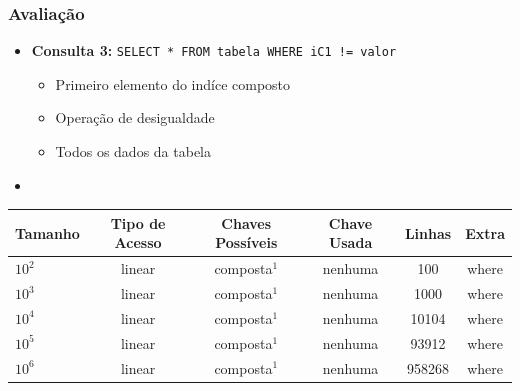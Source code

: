 \documentclass[10pt]{beamer}
\begin{document}
\begin{frame}[fragile]
  \frametitle{Avaliação}

    \begin{itemize}
      \item \textbf{Consulta 3: } \texttt{SELECT * FROM tabela WHERE iC1 != valor}
      \begin{itemize}
        \item[-] Primeiro elemento do indíce composto
        \item[-] Operação de desigualdade
        \item[-] Todos os dados da tabela
      \end{itemize}

      \item[\ ] \ 

    \end{itemize}

     \begin{table}[!htb]
    \footnotesize
    \centering
    \begin{tabular}{lccccc}
      \toprule
      \textbf{Tamanho} & \textbf{Tipo de Acesso}  & \textbf{Chaves Possíveis}  & \textbf{Chave Usada} & \textbf{Linhas} & \textbf{Extra}  \\
      \midrule
      $10^2$  & linear  &  composta$^{1}$  & nenhuma  & 100     & where  \\
      $10^3$  & linear  &  composta$^{1}$  & nenhuma  & 1000    & where  \\
      $10^4$  & linear  &  composta$^{1}$  & nenhuma  & 10104   & where  \\
      $10^5$  & linear  &  composta$^{1}$  & nenhuma  & 93912   & where  \\
      $10^6$  & linear  &  composta$^{1}$  & nenhuma  & 958268  & where  \\

      \bottomrule
    \end{tabular}
    \end{table}

\end{frame}
\end{document}
